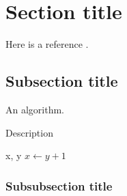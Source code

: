 \documentclass[a4paper]{article}
\begin{document}






\newpage
\tableofcontents
\newpage



\section{Section title}

Here is a reference \cite{ref_example}.


\subsection{Subsection title}

An algorithm.
\begin{algorithm}[H]
\caption{Description}
\begin{algorithmic}[1]
 {x, y} 
\State $x\leftarrow y + 1$
\State
{}
\State
\EndIf
\EndProcedure
\end{algorithmic}
\end{algorithm}

\subsubsection{Subsubsection title}



\newpage
\appendix
\end{document}
